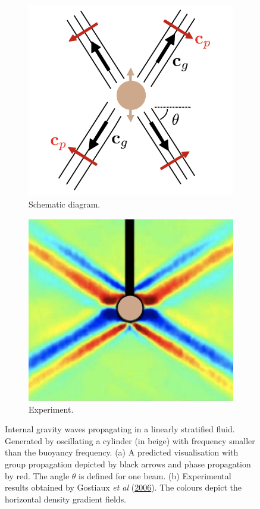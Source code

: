 \documentclass[a4paper]{article}
\numberwithin{equation}{section}
\begin{document}
\begin{figure}[h!]
\centering
\begin{subfigure}[t]{.5\textwidth}
  \centering
  \includegraphics[width=0.6\linewidth]{Images/internal wave pic.PNG}
  \caption{Schematic diagram.}
  \label{fig:sub1}
\end{subfigure}
\begin{subfigure}[t]{.48\textwidth}
  \centering
  \includegraphics[width=0.64\linewidth]{Images/experiment two}
  \caption{Experiment.}
  \label{fig:sub2}
\end{subfigure}
\caption{Internal gravity waves propagating in a linearly stratified fluid. Generated by oscillating a cylinder (in beige) with frequency smaller than the buoyancy frequency. (a) A predicted visualisation with group propagation depicted by black arrows and phase propagation by red. The angle $\theta$ is defined for one beam. (b) Experimental results obtained by Gostiaux \emph{et al} (\protect\hyperlink{ref 6}{2006}). The colours depict the horizontal density gradient fields.}
\label{fig:1}
\end{figure}
\end{document}
